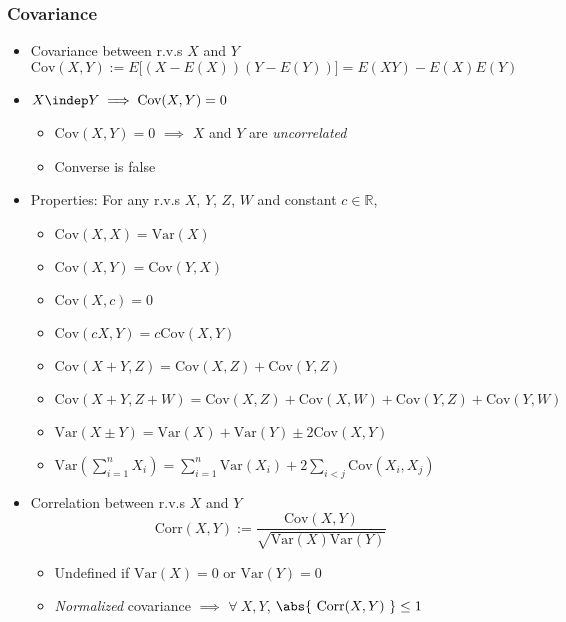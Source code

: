 \subsubsection*{Covariance}
\begin{itemize}
    \item Covariance between r.v.s $X$ and $Y$
    \begin{equation}
        \text{Cov}(X,Y):=E\Bigr[(X-E(X))(Y-E(Y))\Bigr]=E(XY)-E(X)E(Y)
    \end{equation}
    \item $X\indep Y\implies\text{Cov}(X,Y)=0$
    \begin{itemize}
        \item $\text{Cov}(X,Y)=0$ $\implies$ $X$ and $Y$ are \textit{uncorrelated}
        \item Converse is false
    \end{itemize}
    \item Properties: For any r.v.s $X$, $Y$, $Z$, $W$ and constant $c\in\mathbb{R}$,
    \begin{itemize}
        \item $\text{Cov}(X,X)=\text{Var}(X)$
        \item $\text{Cov}(X,Y)=\text{Cov}(Y,X)$
        \item $\text{Cov}(X,c)=0$
        \item $\text{Cov}(cX,Y)=c\text{Cov}(X,Y)$
        \item $\text{Cov}(X+Y,Z)=\text{Cov}(X,Z)+\text{Cov}(Y,Z)$
        \item $\text{Cov}(X+Y,Z+W)=\text{Cov}(X,Z)+\text{Cov}(X,W)+\text{Cov}(Y,Z)+\text{Cov}(Y,W)$
        \item $\text{Var}(X\pm Y)=\text{Var}(X)+\text{Var}(Y)\pm 2\text{Cov}(X,Y)$
        \item $\text{Var}\left(\sum_{i=1}^nX_i\right)=\sum_{i=1}^n\text{Var}(X_i)+2\sum_{i<j}\text{Cov}(X_i,X_j)$
    \end{itemize}
    \item Correlation between r.v.s $X$ and $Y$
    \begin{equation}
        \text{Corr}(X,Y):=\frac{\text{Cov}(X,Y)}{\sqrt{\text{Var}(X)\text{Var}(Y)}}
    \end{equation}
    \begin{itemize}
        \item Undefined if $\text{Var}(X)=0$ or $\text{Var}(Y)=0$
        \item \textit{Normalized} covariance $\implies$ $\forall~X,Y$, $\abs{~\text{Corr}(X,Y)~}\leq 1$
    \end{itemize}
\end{itemize}
